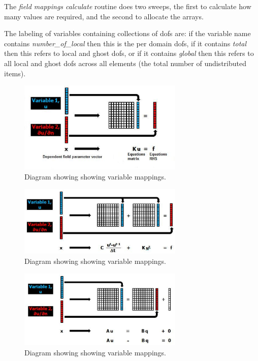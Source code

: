 The \emph{field mappings calculate} routine does two sweeps, the first to
calculate how many values are required, and the second to allocate the arrays.

The labeling of variables containing collections of dofs are: if the variable 
name contains \emph{number\_of\_local} then this is the per domain dofs, if it 
contains \emph{total} then this refers to local and ghost dofs, or if it 
contains \emph{global} then this refers to all local and ghost dofs across all 
elements (the total number of undistributed items).

\begin{figure}
\centering
      \includegraphics[width=0.7\textwidth]{figs/Modules/variable_mapping_1.eps}
\caption{Diagram showing showing variable mappings.}
\label{variable_mapping_1}
\end{figure}

\begin{figure}
\centering
      \includegraphics[width=0.7\textwidth]{figs/Modules/variable_mapping_2.eps}
\caption{Diagram showing showing variable mappings.}
\label{variable_mapping_2}
\end{figure}

\begin{figure}
\centering
      \includegraphics[width=0.7\textwidth]{figs/Modules/variable_mapping_3.eps}
\caption{Diagram showing showing variable mappings.}
\label{variable_mapping_3}
\end{figure}


